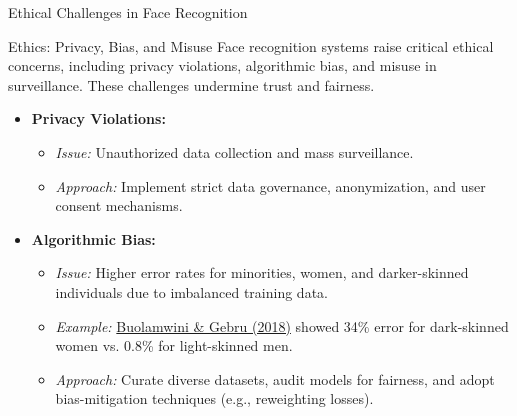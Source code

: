 \documentclass[pdfpagelabels=false, usepdftitle=false, aspectratio=169]{beamer}
\begin{document}
\begin{frame}[fragile]{Ethical Challenges in Face Recognition}
\scriptsize
\begin{block}{{Ethics: Privacy, Bias, and Misuse}}
    Face recognition systems raise critical ethical concerns, including privacy violations, algorithmic bias, and misuse in surveillance. These challenges undermine trust and fairness.
\end{block}
\begin{itemize}
    \item \textbf{Privacy Violations:} 
    \begin{itemize}
        \item \textit{Issue:} Unauthorized data collection and mass surveillance.
        \item \textit{Approach:} Implement strict data governance, anonymization, and user consent mechanisms.
    \end{itemize}
    \item \textbf{Algorithmic Bias:} 
    \begin{itemize}
        \item \textit{Issue:} Higher error rates for minorities, women, and darker-skinned individuals due to imbalanced training data.
        \item \textit{Example:} \href{https://doi.org/10.1145/3359246}{Buolamwini \& Gebru (2018)} showed 34\% error for dark-skinned women vs. 0.8\% for light-skinned men.
        \item \textit{Approach:} Curate diverse datasets, audit models for fairness, and adopt bias-mitigation techniques (e.g., reweighting losses).
    \end{itemize}
\end{itemize}
\end{frame}
\end{document}
